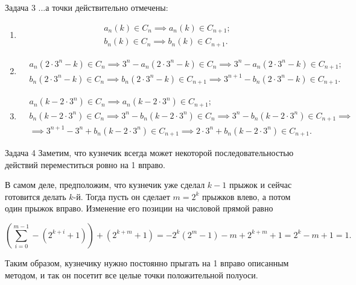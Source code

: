 \documentclass{article}
\begin{document}
\begin{section}{Задача 3}
		...а точки действительно отмечены:

		\begin{enumerate}
			\item
				\begin{align*}
					&a_n(k) \in C_n \implies a_n(k) \in C_{n+1}; \\
					&b_n(k) \in C_n \implies b_n(k) \in C_{n+1}.
				\end{align*}

			\item
				\begin{align*}
					&a_n(2 \cdot 3^n - k) \in C_n \implies 3^n - a_n(2 \cdot 3^n - k) \in C_n \implies 3^n - a_n(2 \cdot 3^n - k) \in C_{n+1}; \\
					&b_n(2 \cdot 3^n - k) \in C_n \implies b_n(2 \cdot 3^n - k) \in C_{n+1} \implies 3^{n+1} - b_n(2 \cdot 3^n - k) \in C_{n+1}.
				\end{align*}

			\item
				\begin{align*}
					&a_n(k - 2 \cdot 3^n) \in C_n \implies a_n(k - 2 \cdot 3^n) \in C_{n+1}; \\
					&b_n(k - 2 \cdot 3^n) \in C_n \implies 3^n - b_n(k - 2 \cdot 3^n) \in C_n \implies 3^n - b_n(k - 2 \cdot 3^n) \in C_{n+1} \implies \\
					&\implies 3^{n+1} - 3^n + b_n(k - 2 \cdot 3^n) \in C_{n+1} \implies 2 \cdot 3^n + b_n(k - 2 \cdot 3^n) \in C_{n+1}.
				\end{align*}
		\end{enumerate}
	\end{section}

	\begin{section}{Задача 4}
		Заметим, что кузнечик всегда может некоторой последовательностью действий переместиться ровно на 1 вправо.

		В самом деле, предположим, что кузнечик уже сделал $k - 1$ прыжок и сейчас готовится делать $k$-й. Тогда пусть он сделает $m = 2^k$ прыжков влево, а потом один прыжок вправо. Изменение его позиции на числовой прямой равно

		\begin{equation*}
			\left( \sum_{i=0}^{m-1} -(2^{k+i} + 1) \right) + (2^{k+m} + 1) = -2^k (2^m - 1) - m + 2^{k+m} + 1 = 2^k - m + 1 = 1.
		\end{equation*}

		Таким образом, кузнечику нужно постоянно прыгать на 1 вправо описанным методом, и так он посетит все целые точки положительной полуоси.
	\end{section}
\end{document}
